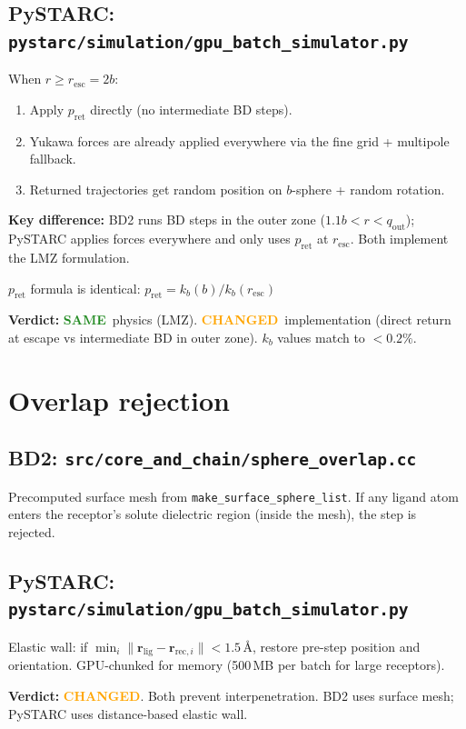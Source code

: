 \documentclass[11pt]{article}
\newcommand{\same}{\textcolor{ForestGreen}{\textbf{SAME}}}
\newcommand{\changed}{\textcolor{Orange}{\textbf{CHANGED}}}
\begin{document}
\subsection{PySTARC: \texttt{pystarc/simulation/gpu\_batch\_simulator.py}}
When $r \ge r_\mathrm{esc} = 2b$:
\begin{enumerate}
\item Apply $p_\mathrm{ret}$ directly (no intermediate BD steps).
\item Yukawa forces are already applied everywhere via the fine grid + multipole fallback.
\item Returned trajectories get random position on $b$-sphere + random rotation.
\end{enumerate}

\textbf{Key difference:} BD2 runs BD steps in the outer zone ($1.1b < r < q_\mathrm{out}$);
PySTARC applies forces everywhere and only uses $p_\mathrm{ret}$ at $r_\mathrm{esc}$.
Both implement the LMZ formulation.

$p_\mathrm{ret}$ formula is identical:
$p_\mathrm{ret} = k_b(b)/k_b(r_\mathrm{esc})$

\textbf{Verdict:} \same\ physics (LMZ). \changed\ implementation
(direct return at escape vs intermediate BD in outer zone).
$k_b$ values match to $<0.2\%$.


\section{Overlap rejection}

\subsection{BD2: \texttt{src/core\_and\_chain/sphere\_overlap.cc}}
Precomputed surface mesh from \texttt{make\_surface\_sphere\_list}.
If any ligand atom enters the receptor's solute dielectric region
(inside the mesh), the step is rejected.

\subsection{PySTARC: \texttt{pystarc/simulation/gpu\_batch\_simulator.py}}
Elastic wall: if $\min_i \|\mathbf{r}_\mathrm{lig} - \mathbf{r}_{\mathrm{rec},i}\| < 1.5$\,\AA,
restore pre-step position and orientation.
GPU-chunked for memory (500\,MB per batch for large receptors).

\textbf{Verdict:} \changed. Both prevent interpenetration.
BD2 uses surface mesh; PySTARC uses distance-based elastic wall.
\end{document}
